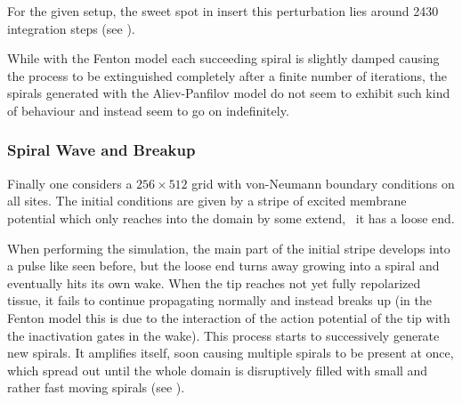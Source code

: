 For the given setup, the sweet spot in insert this perturbation lies around
2430 integration steps (see ).

While with the Fenton model each succeeding spiral is slightly damped causing
the process to be extinguished completely after a finite number of iterations,
the spirals generated with the Aliev-Panfilov model do not seem to exhibit such
kind of behaviour and instead seem to go on indefinitely.


\subsubsection{Spiral Wave and Breakup}
\label{sec:spiral2}
Finally one considers a $256\times512$ grid with von-Neumann boundary
conditions on all sites. The initial conditions are given by a stripe of
excited membrane potential which only reaches into the domain by some extend,
\ie~it has a loose end.

When performing the simulation, the main part of the initial stripe develops
into a pulse like seen before, but the loose end turns away growing into a
spiral and eventually hits its own wake. When the tip reaches not yet fully
repolarized tissue, it fails to continue propagating normally and instead
breaks up (in the Fenton model this is due to the interaction of the action
potential of the tip with the inactivation gates in the wake). This process
starts to successively generate new spirals. It amplifies itself, soon causing
multiple spirals to be present at once, which spread out until the whole domain
is disruptively filled with small and rather fast moving spirals (see
).

